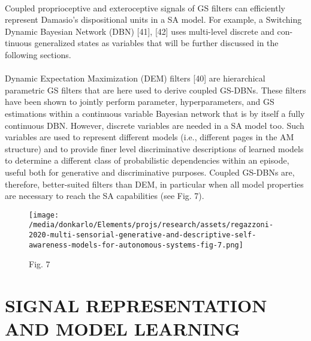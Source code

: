 \documentclass{article}
\begin{document}
		\paragraph{} Coupled proprioceptive and exteroceptive signals of GS
		filters can efficiently represent Damasio’s dispositional units
		in a SA model. For example, a Switching Dynamic Bayesian
		Network (DBN) [41], [42] uses multi-level discrete and con-
		tinuous generalized states as variables that will be further
		discussed in the following sections.
		\paragraph{} Dynamic Expectation Maximization (DEM) filters [40] are
		hierarchical parametric GS filters that are here used to
		derive coupled GS-DBNs. These filters have been shown to
		jointly perform parameter, hyperparameters, and GS estimations within a continuous variable Bayesian network that is
		by itself a fully continuous DBN. However, discrete variables
		are needed in a SA model too. Such variables are used to
		represent different models (i.e., different pages in the AM
		structure) and to provide finer level discriminative descriptions
		of learned models to determine a different class of probabilistic
		dependencies within an episode, useful both for generative
		and discriminative purposes. Coupled GS-DBNs are, therefore,
		better-suited filters than DEM, in particular when all model
		properties are necessary to reach the SA capabilities (see
		Fig. 7).
		\begin{figure*}
			\centering
			\texttt{[image: /media/donkarlo/Elements/projs/research/assets/regazzoni-2020-multi-sensorial-generative-and-descriptive-self-awareness-models-for-autonomous-systems-fig-7.png]}
			\caption{\cite{regazzoni-2020-multi-sensorial-generative-and-descriptive-self-awareness-models-for-autonomous-systems}Fig. 7}
			\label{fig:regazzoni-2020-multi-sensorial-generative-and-descriptive-self-awareness-models-for-autonomous-systems-fig-7.png}
		\end{figure*}
	
	\section{ SIGNAL REPRESENTATION AND MODEL LEARNING}
\end{document}
